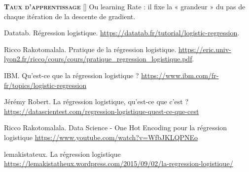\documentclass[10pt,french]{report}
\newcommand{\entreelex}[3][]{%
	{\large \textbf{\textsc{#2}}} %
	\if\relax\detokenize{#1}\relax %
	\else %
	\raisebox{0.15ex}{\scalebox{0.7}{$\Diamond$}} %
	[#1] %
	\fi
	\raisebox{0.13ex}{\scalebox{0.75}{$\blacksquare$}} #3 %
}
\begin{document}
	\label{taux apprentissag}
	\entreelex{Taux d'apprentissage}{Ou learning Rate : il fixe la « grandeur » du pas de chaque itération de la descente de gradient.}

	\listoffigures

    \begin{thebibliography}{1}

    Datatab. Régression logistique. \url{https://datatab.fr/tutorial/logistic-regression}.

    Ricco Rakotomalala. Pratique de la régression logistique. \url{https://eric.univ-lyon2.fr/ricco/cours/cours/pratique_regression_logistique.pdf}.

    IBM. Qu’est-ce que la régression logistique ? \url{https://www.ibm.com/fr-fr/topics/logistic-regression}

    Jérémy Robert. La régression logistique, qu’est-ce que c’est ? \url{https://datascientest.com/regression-logistique-quest-ce-que-cest}

    Ricco Rakotomalala. Data Science - One Hot Encoding pour la régression logistique \url{https://www.youtube.com/watch?v=WfbJKLQPNEo}

    lemakistateux. La régression logistique \url{https://lemakistatheux.wordpress.com/2015/09/02/la-regression-logistique/}

    \end{thebibliography}
\end{document}
